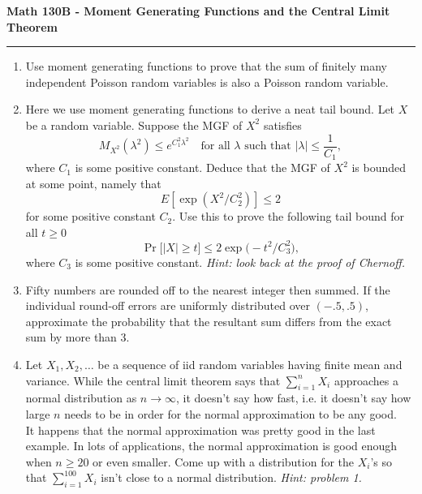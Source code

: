 \documentclass[11pt,letterpaper]{report}
\begin{document}
\begin{center}
{\bf \Large Math 130B - Moment Generating Functions and the Central Limit Theorem}
\vspace{0.2cm}
\hrule
\end{center}

\begin{enumerate}
	\item Use moment generating functions to prove that the sum of finitely many independent Poisson random variables is also a Poisson random variable.

	\vfill

	\item Here we use moment generating functions to derive a neat tail bound. Let $X$ be a random variable. Suppose the MGF of $X^2$ satisfies
	\[
	M_{X^2}(\lambda^2)\leq e^{C_1^2\lambda^2}\quad\text{for all $\lambda$ such that }|\lambda|\leq \frac{1}{C_1},
	\]
	where $C_1$ is some positive constant. Deduce that the MGF of $X^2$ is bounded at some point, namely that
	\[
	E[\exp(X^2/C_2^2)]\leq 2
	\]
	for some positive constant $C_2$. Use this to prove the following tail bound for all $t\geq 0$
	\[
	\Pr\big[|X|\geq t\big]\leq 2\exp\big(-t^2/C_3^2\big),
	\]
	where $C_3$ is some positive constant. \textit{Hint: look back at the proof of Chernoff.}

	\vfill

	\item Fifty numbers are rounded off to the nearest integer then summed. If the individual round-off errors are uniformly distributed over $(-.5, .5)$, approximate the probability that the resultant sum differs from the exact sum by more than 3.

	\vfill

	\item Let $X_1, X_2, \ldots$ be a sequence of iid random variables having finite mean and variance. While the central limit theorem says that $\sum_{i=1}^nX_i$ approaches a normal distribution as $n\to \infty$, it doesn't say how fast, i.e. it doesn't say how large $n$ needs to be in order for the normal approximation to be any good.\\

	It happens that the normal approximation was pretty good in the last example. In lots of applications, the normal approximation is good enough when $n\geq 20$ or even smaller. Come up with a distribution for the $X_i$'s so that $\sum_{i=1}^{100}X_i$ isn't close to a normal distribution. \textit{Hint: problem 1.}
	\vfill
\end{enumerate}
\end{document}
